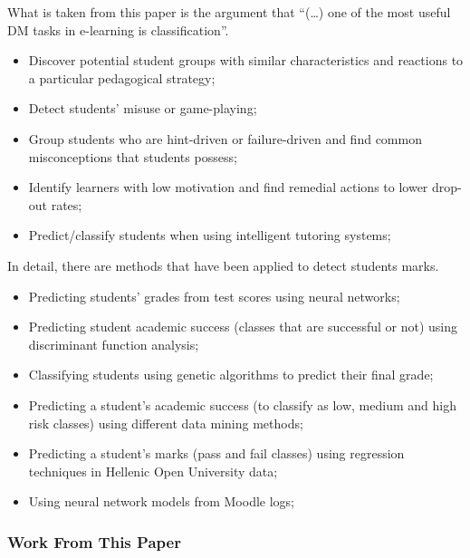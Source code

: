 What is taken from this paper is the argument that ``(\dots) one of the most
useful DM tasks in e-learning is classification''.

\begin{itemize}
    \item Discover potential student groups with similar characteristics and
        reactions to a particular pedagogical strategy; 
    \item Detect students' misuse or game-playing; 
    \item Group students who are hint-driven or failure-driven and find common
        misconceptions that students possess; 
    \item Identify learners with low motivation and find remedial actions to
        lower drop-out rates; 
    \item Predict/classify students when using intelligent tutoring systems;
\end{itemize}

In detail, there are methods that have been applied to detect students marks.

\begin{itemize}
    \item Predicting students' grades from test scores using neural networks;
    \item Predicting student academic success (classes that are successful or
        not) using discriminant function analysis; 
    \item Classifying students using genetic algorithms to predict their final
        grade; 
    \item Predicting a student's academic success (to classify as low, medium
        and high risk classes) using different data mining methods; 
    \item Predicting a student’s marks (pass and fail classes) using regression
        techniques in Hellenic Open University data; 
    \item Using neural network models from Moodle logs; 
\end{itemize}

\subsubsection{Work From This Paper}

